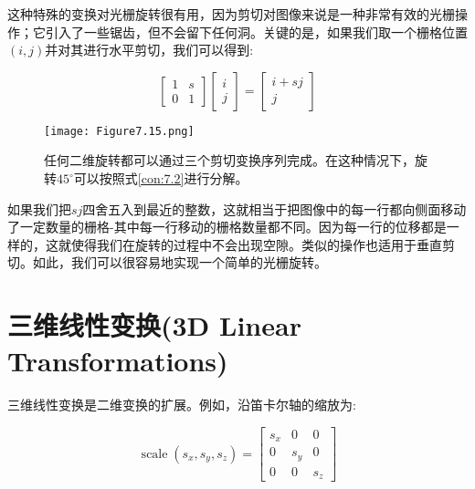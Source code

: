 这种特殊的变换对光栅旋转很有用，因为剪切对图像来说是一种非常有效的光栅操作；它引入了一些锯齿，但不会留下任何洞。关键的是，如果我们取一个栅格位置$(i,j)$并对其进行水平剪切，我们可以得到:

\begin{equation}
	\left[\begin{array}{ll}
		1 & s \\
		0 & 1
	\end{array}\right]\left[\begin{array}{l}
		i \\
		j
	\end{array}\right]=\left[\begin{array}{c}
		i + s j \\
		j
	\end{array}\right]
\end{equation}

\begin{figure}[htbp]
	\centering
	\texttt{[image: Figure7.15.png]}
	\caption{任何二维旋转都可以通过三个剪切变换序列完成。在这种情况下，旋转$45^{\circ}$可以按照式\ref{con:7.2}进行分解。}
	\label{fig:7.15}
\end{figure}	

如果我们把$sj$四舍五入到最近的整数，这就相当于把图像中的每一行都向侧面移动了一定数量的栅格-其中每一行移动的栅格数量都不同。因为每一行的位移都是一样的，这就使得我们在旋转的过程中不会出现空隙。类似的操作也适用于垂直剪切。如此，我们可以很容易地实现一个简单的光栅旋转。

\section{三维线性变换(3D Linear Transformations)}

三维线性变换是二维变换的扩展。例如，沿笛卡尔轴的缩放为:

\begin{equation}
	\operatorname{scale}\left(s_x, s_y, s_z\right)=\left[\begin{array}{ccc}
		s_x & 0 & 0 \\
		0 & s_y & 0 \\
		0 & 0 & s_z
	\end{array}\right]
\nonumber
\end{equation}


